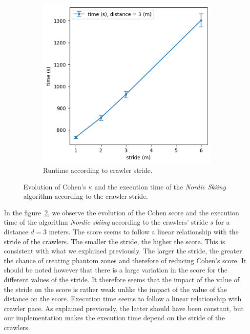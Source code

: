 \begin{figure}[h!]
\begin{subfigure}[t]{0.49\linewidth}
		\includegraphics[width=\linewidth]{graphics/ski_nordique-time_vs_stride.png}
		\caption{Runtime according to crawler stride.}
		\label{fig:ski_nordique-time_vs_stride}
	\end{subfigure}
	\caption{Evolution of Cohen's $\kappa$ and the execution time of the \textit{Nordic Skiing} algorithm according to the crawler stride.}
	\label{fig:ski_nordique-stride}
\end{figure}

In the figure~\ref{fig:ski_nordique-stride}, we observe the evolution of the Cohen score and the execution time of the algorithm \textit{Nordic skiing} according to the crawlers' stride $s$ for a distance $d = 3$ meters.
The score seems to follow a linear relationship with the stride of the crawlers.
The smaller the stride, the higher the score.
This is consistent with what we explained previously.
The larger the stride, the greater the chance of creating phantom zones and therefore of reducing Cohen's score.
It should be noted however that there is a large variation in the score for the different values of the stride.
It therefore seems that the impact of the value of the stride on the score is rather weak unlike the impact of the value of the distance on the score.
Execution time seems to follow a linear relationship with crawler pace.
As explained previously, the latter should have been constant, but our implementation makes the execution time depend on the stride of the crawlers.


